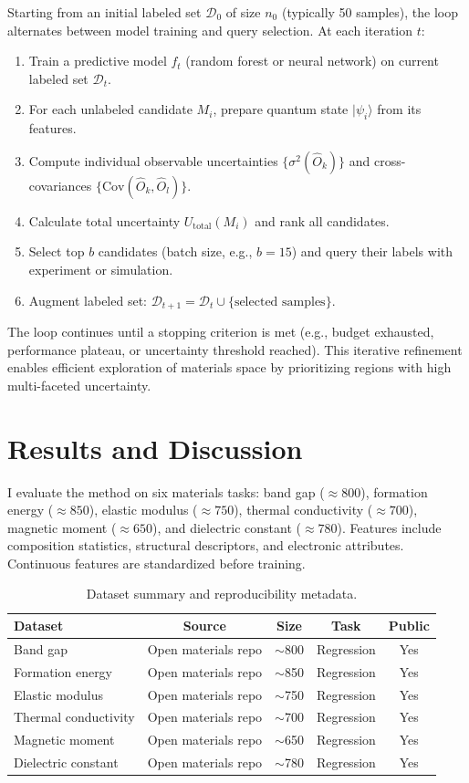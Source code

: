 \documentclass[conference]{IEEEtran}
\begin{document}
Starting from an initial labeled set $\mathcal{D}_0$ of size $n_0$ (typically 50 samples), the loop alternates between model training and query selection. At each iteration $t$:
\begin{enumerate}
    \item Train a predictive model $f_t$ (random forest or neural network) on current labeled set $\mathcal{D}_t$.
    \item For each unlabeled candidate $M_i$, prepare quantum state $|\psi_i\rangle$ from its features.
    \item Compute individual observable uncertainties $\{\sigma^2(\hat{O}_k)\}$ and cross-covariances $\{\text{Cov}(\hat{O}_k,\hat{O}_l)\}$.
    \item Calculate total uncertainty $U_{\text{total}}(M_i)$ and rank all candidates.
    \item Select top $b$ candidates (batch size, e.g., $b=15$) and query their labels with experiment or simulation.
    \item Augment labeled set: $\mathcal{D}_{t+1} = \mathcal{D}_t \cup \{\text{selected samples}\}$.
\end{enumerate}
The loop continues until a stopping criterion is met (e.g., budget exhausted, performance plateau, or uncertainty threshold reached). This iterative refinement enables efficient exploration of materials space by prioritizing regions with high multi-faceted uncertainty.

\section{Results and Discussion}

I evaluate the method on six materials tasks: band gap ($\approx 800$), formation energy ($\approx 850$), elastic modulus ($\approx 750$), thermal conductivity ($\approx 700$), magnetic moment ($\approx 650$), and dielectric constant ($\approx 780$). Features include composition statistics, structural descriptors, and electronic attributes. Continuous features are standardized before training.

\begin{table}[!t]
\centering
\caption{Dataset summary and reproducibility metadata.}
\label{tab:dataset_summary}
\begin{tabular}{lcccc}
\toprule
Dataset & Source & Size & Task & Public \\
\midrule
Band gap & Open materials repo & $\sim$800 & Regression & Yes \\
Formation energy & Open materials repo & $\sim$850 & Regression & Yes \\
Elastic modulus & Open materials repo & $\sim$750 & Regression & Yes \\
Thermal conductivity & Open materials repo & $\sim$700 & Regression & Yes \\
Magnetic moment & Open materials repo & $\sim$650 & Regression & Yes \\
Dielectric constant & Open materials repo & $\sim$780 & Regression & Yes \\
\bottomrule
\end{tabular}
\end{table}
\end{document}
